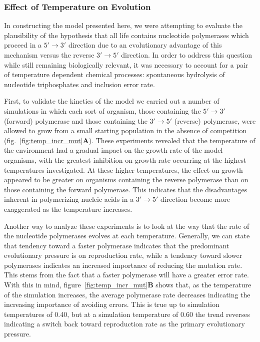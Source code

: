 \subsubsection*{Effect of Temperature on Evolution}
In constructing the model presented here, we were attempting to evaluate the plausibility of the hypothesis that all life contains nucleotide polymerases which proceed in a $5'\to3'$ direction due to an evolutionary advantage of this mechanism versus the reverse $3'\to5'$ direction. In order to address this question while still remaining biologically relevant, it was necessary to account for a pair of temperature dependent chemical processes: spontaneous hydrolysis of nucleotide triphosphates and inclusion error rate.

First, to validate the kinetics of the model we carried out a number of simulations in which each sort of organism, those containing the $5'\to3'$ (forward) polymerase and those containing the $3'\to5'$ (reverse) polymerase, were allowed to grow from a small starting population in the absence of competition (fig.~\ref{fig:temp_incr_mut}\textbf{A}). These experiments revealed that the temperature of the environment had a gradual impact on the growth rate of the model organisms, with the greatest inhibition on growth rate occurring at the highest temperatures investigated. At these higher temperatures, the effect on growth appeared to be greater on organisms containing the reverse polymerase than on those containing the forward polymerase. This indicates that the disadvantages inherent in polymerizing nucleic acids in a $3'\to5'$ direction become more exaggerated as the temperature increases.

Another way to analyze these experiments is to look at the way that the rate of the nucleotide polymerases evolves at each temperature. Generally, we can state that tendency toward a faster polymerase indicates that the predominant evolutionary pressure is on reproduction rate, while a tendency toward slower polymerases indicates an increased importance of reducing the mutation rate. This stems from the fact that a faster polymerase will have a greater error rate. With this in mind, figure~\ref{fig:temp_incr_mut}\textbf{B} shows that, as the temperature of the simulation increases, the average polymerase rate decreases indicating the increasing importance of avoiding errors. This is true up to simulation temperatures of 0.40, but at a simulation temperature of 0.60 the trend reverses indicating a switch back toward reproduction rate as the primary evolutionary pressure.

